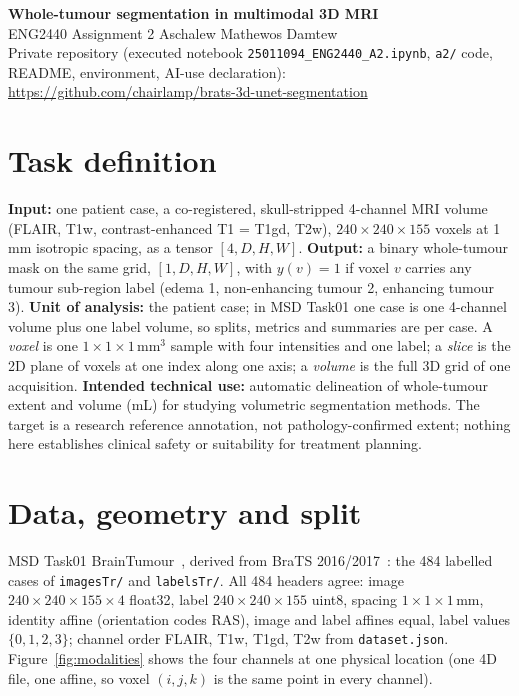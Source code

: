 \documentclass[10pt,a4paper]{article}
\newcommand{\repo}{https://github.com/chairlamp/brats-3d-unet-segmentation}
\newcommand{\mm}{\,mm}
\begin{document}
{\centering
{\Large\bfseries Whole-tumour segmentation in multimodal 3D MRI}\\[3pt]
{\large ENG2440 Assignment 2 \quad Aschalew Mathewos Damtew }\\[3pt]
{\small Private repository (executed notebook \texttt{25011094\_ENG2440\_A2.ipynb}, \texttt{a2/} code, README, environment, AI-use declaration): \url{\repo}}\par}
\vspace{4pt}

\section{Task definition}
\textbf{Input:} one patient case, a co-registered, skull-stripped 4-channel MRI volume (FLAIR, T1w, contrast-enhanced T1 = T1gd, T2w), $240\times240\times155$ voxels at 1\mm{} isotropic spacing, as a tensor $[4,D,H,W]$. \textbf{Output:} a binary whole-tumour mask on the same grid, $[1,D,H,W]$, with $y(v)=1$ if voxel $v$ carries any tumour sub-region label (edema 1, non-enhancing tumour 2, enhancing tumour 3). \textbf{Unit of analysis:} the patient case; in MSD Task01 one case is one 4-channel volume plus one label volume, so splits, metrics and summaries are per case. A \emph{voxel} is one $1\times1\times1$\mm$^3$ sample with four intensities and one label; a \emph{slice} is the 2D plane of voxels at one index along one axis; a \emph{volume} is the full 3D grid of one acquisition. \textbf{Intended technical use:} automatic delineation of whole-tumour extent and volume (mL) for studying volumetric segmentation methods. The target is a research reference annotation, not pathology-confirmed extent; nothing here establishes clinical safety or suitability for treatment planning.

\section{Data, geometry and split}
MSD Task01 BrainTumour~\cite{antonelli2022,msd2018}, derived from BraTS 2016/2017~\cite{menze2015}: the 484 labelled cases of \texttt{imagesTr/} and \texttt{labelsTr/}. All 484 headers agree: image $240\times240\times155\times4$ float32, label $240\times240\times155$ uint8, spacing $1\times1\times1$\mm, identity affine (orientation codes RAS), image and label affines equal, label values $\{0,1,2,3\}$; channel order FLAIR, T1w, T1gd, T2w from \texttt{dataset.json}. Figure~\ref{fig:modalities} shows the four channels at one physical location (one 4D file, one affine, so voxel $(i,j,k)$ is the same point in every channel).
\end{document}
